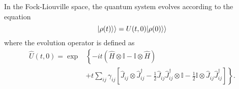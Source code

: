 In the Fock-Liouville space, the quantum system evolves according to the equation
\begin{equation}
    \lvert\rho(t)\rangle\rangle  = U(t,0) \lvert\rho(0)\rangle\rangle
\end{equation} 
where the evolution operator is defined as \cite{Domino}
\begin{equation}
    \begin{split}
        \hat U(t,0) = \exp&\left\{-it\left(\hat H\otimes\mathbb{I}-\mathbb{I}\otimes\hat H\right)\right.\\
        &+\left. t\sum_{ij}\gamma_{ij}\left[ \hat J_{ij}\otimes\hat J^\dagger_{ij}-\frac{1}{2}\hat J_{ij}\hat J^\dagger_{ij}\otimes\mathbb{I}-\frac{1}{2}\mathbb{I}\otimes\hat J_{ij}\hat J^\dagger_{ij}\right]\right\}.
    \end{split}
\end{equation}

